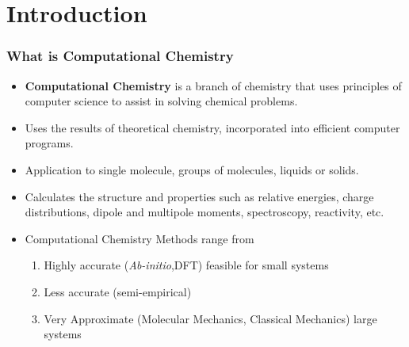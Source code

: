 \documentclass[slidestop,mathserif,compress,xcolor=svgnames]{beamer}
\newenvironment{bblock}[0]
{
\begin{beamerboxesrounded}[upper=uppercol1,lower=lowercol1,shadow=true]}
{\end{beamerboxesrounded}}
\begin{document}
\section{Introduction}
\begin{frame}
  \frametitle{\small What is Computational Chemistry}
  \begin{bblock}{}
    \begin{itemize}
    \item {\bf Computational Chemistry} is a branch of chemistry that uses principles of computer science to assist in solving chemical problems.
    \item Uses the results of theoretical chemistry, incorporated into efficient computer programs.
    \item Application to single molecule, groups of molecules, liquids or solids.
    \item Calculates the structure and properties such as relative energies, charge distributions, dipole and multipole moments, spectroscopy, reactivity, etc.
    \item Computational Chemistry Methods range from
      \begin{enumerate}
      \item Highly accurate ({\it Ab-initio},DFT) feasible for small systems
      \item Less accurate (semi-empirical)
      \item Very Approximate (Molecular Mechanics, Classical Mechanics) large systems
      \end{enumerate}
    \end{itemize}
  \end{bblock}
\end{frame}
\end{document}
